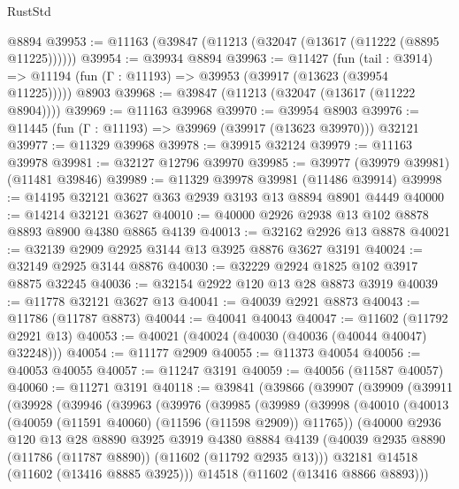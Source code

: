 \begin{lexlean}{RustStd}
\begin{coremodule}
    @8894
@39953 := @11163 (@39847 (@11213 (@32047 (@13617 (@11222 (@8895 @11225))))))
@39954 := @39934 @8894
@39963 := @11427
    (fun (tail : @3914) => @11194 (fun (Γ : @11193) => @39953 (@39917 (@13623 (@39954 @11225)))))
    @8903
@39968 := @39847 (@11213 (@32047 (@13617 (@11222 @8904))))
@39969 := @11163 @39968
@39970 := @39954 @8903
@39976 := @11445 (fun (Γ : @11193) => @39969 (@39917 (@13623 @39970))) @32121
@39977 := @11329 @39968
@39978 := @39915 @32124
@39979 := @11163 @39978
@39981 := @32127 @12796 @39970
@39985 := @39977 (@39979 @39981) (@11481 @39846)
@39989 := @11329 @39978 @39981 (@11486 @39914)
@39998 := @14195 @32121 @3627 @363 @2939 @3193 @13 @8894 @8901 @4449
@40000 := @14214 @32121 @3627
@40010 := @40000 @2926 @2938 @13 @102 @8878 @8893 @8900 @4380 @8865 @4139
@40013 := @32162 @2926 @13 @8878
@40021 := @32139 @2909 @2925 @3144 @13 @3925 @8876 @3627 @3191
@40024 := @32149 @2925 @3144 @8876
@40030 := @32229 @2924 @1825 @102 @3917 @8875 @32245
@40036 := @32154 @2922 @120 @13 @28 @8873 @3919
@40039 := @11778 @32121 @3627 @13
@40041 := @40039 @2921 @8873
@40043 := @11786 (@11787 @8873)
@40044 := @40041 @40043
@40047 := @11602 (@11792 @2921 @13)
@40053 := @40021 (@40024 (@40030 (@40036 (@40044 @40047) @32248)))
@40054 := @11177 @2909
@40055 := @11373 @40054
@40056 := @40053 @40055
@40057 := @11247 @3191
@40059 := @40056 (@11587 @40057)
@40060 := @11271 @3191
@40118 := @39841
    (@39866
      (@39907
        (@39909
          (@39911
            (@39928
              (@39946
                (@39963
                  (@39976
                    (@39985
                      (@39989
                        (@39998
                          (@40010
                            (@40013 (@40059 (@11591 @40060) (@11596 (@11598 @2909)) @11765))
                            (@40000
                              @2936
                              @120
                              @13
                              @28
                              @8890
                              @3925
                              @3919
                              @4380
                              @8884
                              @4139
                              (@40039
                                @2935
                                @8890
                                (@11786 (@11787 @8890))
                                (@11602 (@11792 @2935 @13)))
                              @32181
                              @14518
                              (@11602 (@13416 @8885 @3925)))
                            @14518
                            (@11602 (@13416 @8866 @8893)))

\end{coremodule}
\end{lexlean}
